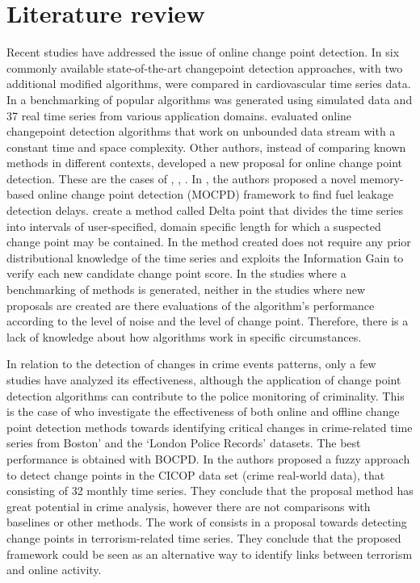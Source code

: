\documentclass[journal,article,submit,pdftex,moreauthors]{Definitions/mdpi}
\begin{document}
\section{Literature review}
Recent studies have addressed the issue of online change point detection.  In \cite{cakmak2024benchmarking} six commonly available state-of-the-art changepoint detection approaches, with two additional modified algorithms, were compared in cardiovascular time series data. In \cite{van2020evaluation} a benchmarking of popular algorithms was generated using simulated data and 37 real time series from various application domains. \cite{wang2021online} evaluated online changepoint detection algorithms that work on unbounded data stream with a constant time and space complexity. Other authors, instead of comparing known methods in different contexts, developed a new proposal for online change point detection. These are the cases of \cite{chu2025real}, \cite{zameni2020unsupervised}, \cite{gold2018doubly}. In \cite{chu2025real}, the authors proposed a novel memory-based online change point detection (MOCPD) framework to find fuel leakage detection delays. \cite{gold2018doubly} create a method called Delta point that divides the time series into intervals of user-specified, domain specific length for which a suspected change point may be contained. In \cite{zameni2020unsupervised} the method created does not require any prior distributional knowledge of the time series and exploits the Information Gain to verify each new candidate change point score. In the studies where a benchmarking of methods is generated, neither in the studies where new proposals are created are there evaluations of the algorithm’s performance according to the level of noise and the level of change point. Therefore, there is a lack of knowledge about how algorithms work in specific circumstances.\par
In relation to the detection of changes in crime events patterns, only a few studies have analyzed its effectiveness, although the application of change point detection algorithms can contribute to the police monitoring of criminality. This is the case of \cite{konstantinou2023trend} who investigate the effectiveness of both online and offline change point detection methods towards identifying critical changes in crime-related time series from Boston’ and the ‘London Police Records’ datasets. The best performance is obtained with BOCPD. In \cite{albertetti2016change} the authors proposed a fuzzy approach to detect change points in the CICOP data set (crime real-world data), that consisting of 32 monthly time series. They conclude that the proposal method has great potential in crime analysis, however there are not comparisons with baselines or other methods.  The work of \cite{theodosiadou2021change} consists in a proposal towards detecting change points in terrorism-related time series. They conclude that the proposed framework could be seen as an alternative way to identify links between terrorism and online activity.
\end{document}

